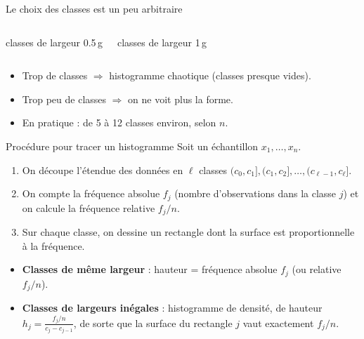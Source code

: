 \documentclass{BeamerTemplate}
\begin{document}
\begin{frame}[t]{Le choix des classes est un peu arbitraire}
  \begin{columns}[T]
     classes de largeur 0.5\,g

     classes de largeur 1\,g

  \end{columns}

  \medskip
  \begin{itemize}
    \item Trop de classes $\Rightarrow$ histogramme chaotique (classes presque
      vides).
    \item Trop peu de classes $\Rightarrow$ on ne voit plus la forme.
    \item En pratique : de \alert{5 à 12 classes} environ, selon $n$.
  \end{itemize}
\end{frame}

\begin{frame}[t]{Procédure pour tracer un histogramme}
  Soit un échantillon $x_1, \ldots, x_n$.
  \begin{enumerate}\itemsep 1mm
    \item On découpe l'étendue des données en $\ell$ classes
      $(c_0, c_1], (c_1, c_2], \ldots, (c_{\ell-1}, c_\ell]$.
    \item On compte la \alert{fréquence absolue} $f_j$ (nombre d'observations
      dans la classe $j$) et on calcule la \alert{fréquence relative} $f_j/n$.
    \item Sur chaque classe, on dessine un rectangle dont la \alert{surface}
      est proportionnelle à la fréquence.
  \end{enumerate}

  \medskip
  \begin{itemize}\itemsep 2mm
    \item \textbf{Classes de même largeur} : hauteur = fréquence absolue $f_j$
      (ou relative $f_j/n$).
    \item \textbf{Classes de largeurs inégales} : histogramme de
      \alert{densité}, de hauteur
      $\displaystyle h_j = \frac{f_j/n}{c_j - c_{j-1}}$,
      de sorte que la surface du rectangle $j$ vaut exactement $f_j/n$.
  \end{itemize}
\end{frame}
\end{document}

